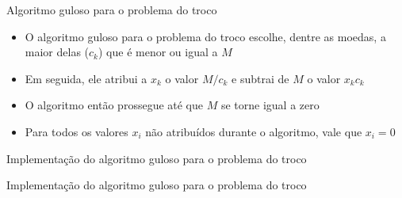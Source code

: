\begin{frame}[fragile]{Algoritmo guloso para o problema do troco}

    \begin{itemize}
        \item O algoritmo guloso para o problema do troco escolhe, dentre as moedas, a maior delas
            ($c_k$) que é menor ou igual a $M$

        \item Em seguida, ele atribui a $x_k$ o valor $M/c_k$ e subtrai de $M$ o valor $x_kc_k$

        \item O algoritmo então prossegue até que $M$ se torne igual a zero
            
        \item Para todos os valores $x_i$ não atribuídos durante o algoritmo, vale que $x_i = 0$ 

    \end{itemize}

\end{frame}

\begin{frame}[fragile]{Implementação do algoritmo guloso para o problema do troco}
\end{frame}

\begin{frame}[fragile]{Implementação do algoritmo guloso para o problema do troco}
\end{frame}
